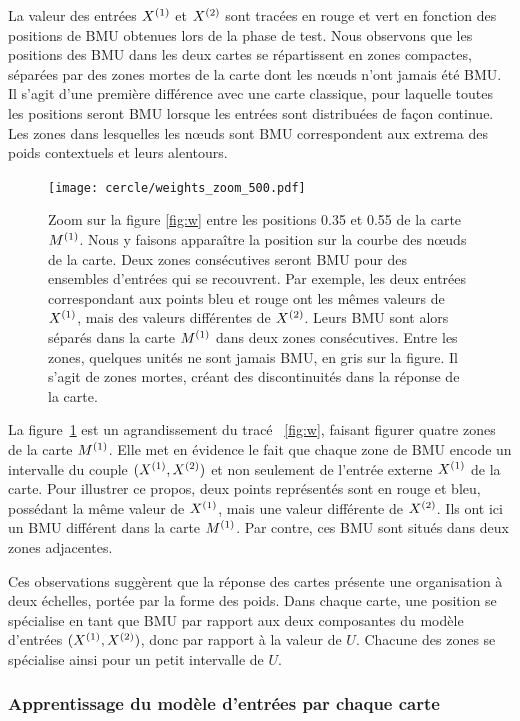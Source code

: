 \documentclass[../main]{subfiles}
\begin{document}
La valeur des entrées $X^{({1})}$ et $X^{({2})}$ sont tracées en rouge et vert en fonction des positions de BMU obtenues lors de la phase de test.
Nous observons que les positions des BMU dans les deux cartes se répartissent en zones compactes, séparées par des zones mortes de la carte dont les n\oe{}uds n'ont jamais été BMU. 
Il s'agit d'une première différence avec une carte classique, pour laquelle toutes les positions seront BMU lorsque les entrées sont distribuées de façon continue. Les zones dans lesquelles les n\oe{}uds sont BMU correspondent aux extrema des poids contextuels et leurs alentours.


\begin{figure}[ht]
	\centering\texttt{[image: cercle/weights\_zoom\_500.pdf]}
   \caption{Zoom sur la figure \ref{fig:w} entre les positions 0.35 et 0.55 de la carte $M^{({1})}$. 
   Nous y faisons apparaître la position sur la courbe des n\oe{}uds de la carte.
   Deux zones consécutives seront BMU pour des ensembles d'entrées qui se recouvrent. Par exemple, les deux entrées correspondant aux points bleu et rouge ont les mêmes valeurs de $X^{({1})}$, mais des valeurs différentes de $X^{({2})}$. Leurs BMU sont alors séparés dans la carte $M^{({1})}$ dans deux zones consécutives.
   Entre les zones, quelques unités ne sont jamais BMU, en gris sur la figure. Il s'agit de zones mortes, créant des discontinuités dans la réponse de la carte.
   \label{fig:w_zoom}}
\end{figure}

La figure~\ref{fig:w_zoom} est un agrandissement du tracé ~\ref{fig:w}, faisant figurer quatre zones de la carte $M^{({1})}$. 
Elle met en évidence le fait que chaque zone de BMU encode un intervalle du couple $(X^{({1})}, X^{({2})})$ et non seulement de l'entrée externe $X^{({1})}$ de la carte.
Pour illustrer ce propos, deux points représentés sont en rouge et bleu, possédant la même valeur de $X^{({1})}$, mais une valeur différente de $X^{({2})}$. Ils ont ici un BMU différent dans la carte $M^{({1})}$. Par contre, ces BMU sont situés dans deux zones adjacentes.

Ces observations suggèrent que la réponse des cartes présente une organisation à deux échelles, portée par la forme des poids. Dans chaque carte, une position se spécialise en tant que BMU par rapport aux deux composantes du modèle d'entrées $(X^{({1})}, X^{({2})})$, donc par rapport à la valeur de $U$.
Chacune des zones se spécialise ainsi pour un petit intervalle de $U$.

\subsubsection{Apprentissage du modèle d'entrées par chaque carte}
\end{document}
